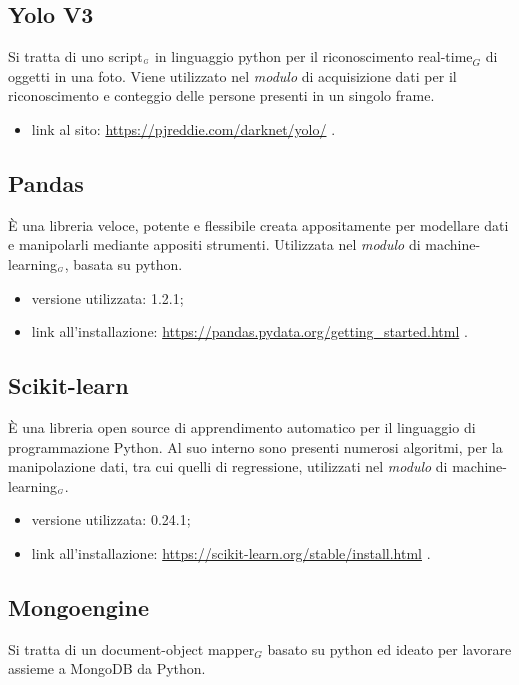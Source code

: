 \subsection{Yolo V3}\label{LibrerieYoloV3}
Si tratta di uno script$_{\scaleto{G}{3pt}}$ in linguaggio python per il riconoscimento real-time$_G$ di oggetti in una foto.
Viene utilizzato nel \textit{modulo} di acquisizione dati per il riconoscimento e conteggio delle persone presenti in un singolo frame.

\begin{itemize}
  \item link al sito: \url{https://pjreddie.com/darknet/yolo/} .
\end{itemize}

\subsection{Pandas}\label{LibreriePandas}
È una libreria veloce, potente e flessibile creata appositamente per modellare dati e manipolarli mediante appositi strumenti.
Utilizzata nel \textit{modulo} di machine-learning$_{\scaleto{G}{3pt}}$, basata su python.

\begin{itemize}
  \item versione utilizzata: 1.2.1;
  \item link all'installazione: \url{https://pandas.pydata.org/getting_started.html} .
\end{itemize}

\subsection{Scikit-learn}\label{LibrerieScikitLearn}
È una libreria open source di apprendimento automatico per il linguaggio di programmazione Python.
Al suo interno sono presenti numerosi algoritmi, per la manipolazione dati, tra cui quelli di regressione, utilizzati nel \textit{modulo} di machine-learning$_{\scaleto{G}{3pt}}$.

\begin{itemize}
  \item versione utilizzata: 0.24.1;
  \item link all'installazione: \url{https://scikit-learn.org/stable/install.html} .
\end{itemize}

\subsection{Mongoengine}\label{LibrerieMongoengine}
Si tratta di un document-object mapper$_G$ basato su python ed ideato per lavorare assieme a MongoDB da Python.

